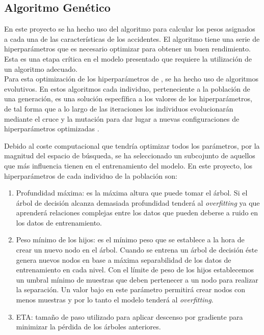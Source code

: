     \subsection{Algoritmo Genético}


        En este proyecto se ha hecho uso del algoritmo  para calcular los pesos asignados a cada una de las características de los accidentes. El algoritmo  tiene una serie de hiperparámetros que es necesario optimizar para obtener un buen rendimiento. Esta es una etapa crítica en el modelo presentado que requiere la utilización de un algoritmo adecuado.\\

        Para esta optimización de los hiperparámetros de , se ha hecho uso de algoritmos evolutivos. En estos algoritmos cada individuo, perteneciente a la población de una generación, es una solución especfífica a los valores de los hiperparámetros, de tal forma que a lo largo de las iteraciones los individuos evolucionarán mediante el cruce y la mutación para dar lugar a nuevas configuraciones de hiperparámetros optimizadas \cite{GAXGBoostPaper}.

        Debido al coste computacional que tendría optimizar todos los parámetros, por la magnitud del espacio de búsqueda, se ha seleccionado un subcojunto de aquellos que más influencia tienen en el entrenamiento del modelo. En este proyecto, los hiperparámetros de cada individuo de la población son:

        \begin{enumerate}

            \item Profundidad máxima: es la máxima altura que puede tomar el árbol. Si el árbol de decisión alcanza demasiada profundidad tenderá al \textit{overfitting} ya que aprenderá relaciones complejas entre los datos que pueden deberse a ruido en los datos de entrenamiento.

            \item Peso mínimo de los hijos: es el mínimo peso que se establece a la hora de crear un nuevo nodo en el árbol. Cuando se entrena un árbol de decisión éste genera nuevos nodos en base a máxima separabilidad de los datos de entrenamiento en cada nivel. Con el límite de peso de los hijos establecemos un umbral mínimo de muestras que deben pertenecer a un nodo para realizar la separación. Un valor bajo en este parámetro permitirá crear nodos con menos muestras y por lo tanto el modelo tenderá al \textit{overfitting}.

            \item ETA: tamaño de paso utilizado para aplicar descenso por gradiente para minimizar la pérdida de los árboles anteriores.

        \end{enumerate}

